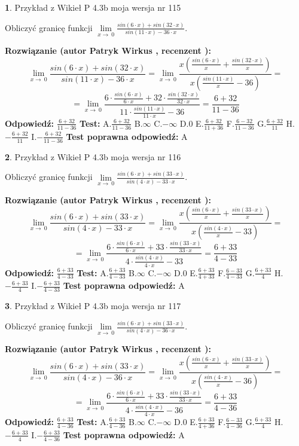 \documentclass[12pt, a4paper]{article}
\theoremstyle{definition} %
\newtheorem{zad}{}
\newcommand{\zadStart}[1]{\begin{zad}#1\newline}
\newcommand{\zadStop}{\end{zad}}
\newcommand{\rozwStart}[2]{\noindent \textbf{Rozwiązanie (autor #1 , recenzent #2): }\newline}
\newcommand{\rozwStop}{\newline}
\newcommand{\odpStart}{\noindent \textbf{Odpowiedź:}\newline}
\newcommand{\odpStop}{\newline}
\newcommand{\testStart}{\noindent \textbf{Test:}\newline}
\newcommand{\testStop}{\newline}
\newcommand{\kluczStart}{\noindent \textbf{Test poprawna odpowiedź:}\newline}
\newcommand{\kluczStop}{\newline}
\begin{document}
\zadStart{Przykład z Wikieł P 4.3b moja wersja nr 115}


Obliczyć granicę funkcji $\lim\limits_{x\to\ 0}\frac{sin(6 \cdot x)+sin(32 \cdot x)}{sin(11 \cdot x)-36 \cdot x}$.
\zadStop
\rozwStart{Patryk Wirkus}{}
$$\lim\limits_{x\to\ 0}\frac{sin(6 \cdot x)+sin(32 \cdot x)}{sin(11 \cdot x)-36 \cdot x}=\lim\limits_{x\to\ 0}\frac{x(\frac{sin(6 \cdot x)}{x}+\frac{sin(32 \cdot x)}{x})}{x(\frac{sin(11 \cdot x)}{x}-36)}=$$
$$=\lim\limits_{x\to\ 0}\frac{6 \cdot \frac{sin(6 \cdot x)}{6 \cdot x}+32 \cdot \frac{sin(32 \cdot x)}{32 \cdot x}}{11 \cdot \frac{sin(11 \cdot x)}{11 \cdot x}-36}=\frac{6+32}{11-36}$$
\rozwStop
\odpStart
$\frac{6+32}{11-36}$
\odpStop
\testStart
A.$\frac{6+32}{11-36}$
B.$\infty$
C.$-\infty$
D.$0$
E.$\frac{6+32}{11+36}$
F.$\frac{6-32}{11-36}$
G.$\frac{6+32}{11}$
H.$-\frac{6+32}{11}$
I.$-\frac{6+32}{11-36}$
\testStop
\kluczStart
A
\kluczStop



\zadStart{Przykład z Wikieł P 4.3b moja wersja nr 116}


Obliczyć granicę funkcji $\lim\limits_{x\to\ 0}\frac{sin(6 \cdot x)+sin(33 \cdot x)}{sin(4 \cdot x)-33 \cdot x}$.
\zadStop
\rozwStart{Patryk Wirkus}{}
$$\lim\limits_{x\to\ 0}\frac{sin(6 \cdot x)+sin(33 \cdot x)}{sin(4 \cdot x)-33 \cdot x}=\lim\limits_{x\to\ 0}\frac{x(\frac{sin(6 \cdot x)}{x}+\frac{sin(33 \cdot x)}{x})}{x(\frac{sin(4 \cdot x)}{x}-33)}=$$
$$=\lim\limits_{x\to\ 0}\frac{6 \cdot \frac{sin(6 \cdot x)}{6 \cdot x}+33 \cdot \frac{sin(33 \cdot x)}{33 \cdot x}}{4 \cdot \frac{sin(4 \cdot x)}{4 \cdot x}-33}=\frac{6+33}{4-33}$$
\rozwStop
\odpStart
$\frac{6+33}{4-33}$
\odpStop
\testStart
A.$\frac{6+33}{4-33}$
B.$\infty$
C.$-\infty$
D.$0$
E.$\frac{6+33}{4+33}$
F.$\frac{6-33}{4-33}$
G.$\frac{6+33}{4}$
H.$-\frac{6+33}{4}$
I.$-\frac{6+33}{4-33}$
\testStop
\kluczStart
A
\kluczStop



\zadStart{Przykład z Wikieł P 4.3b moja wersja nr 117}


Obliczyć granicę funkcji $\lim\limits_{x\to\ 0}\frac{sin(6 \cdot x)+sin(33 \cdot x)}{sin(4 \cdot x)-36 \cdot x}$.
\zadStop
\rozwStart{Patryk Wirkus}{}
$$\lim\limits_{x\to\ 0}\frac{sin(6 \cdot x)+sin(33 \cdot x)}{sin(4 \cdot x)-36 \cdot x}=\lim\limits_{x\to\ 0}\frac{x(\frac{sin(6 \cdot x)}{x}+\frac{sin(33 \cdot x)}{x})}{x(\frac{sin(4 \cdot x)}{x}-36)}=$$
$$=\lim\limits_{x\to\ 0}\frac{6 \cdot \frac{sin(6 \cdot x)}{6 \cdot x}+33 \cdot \frac{sin(33 \cdot x)}{33 \cdot x}}{4 \cdot \frac{sin(4 \cdot x)}{4 \cdot x}-36}=\frac{6+33}{4-36}$$
\rozwStop
\odpStart
$\frac{6+33}{4-36}$
\odpStop
\testStart
A.$\frac{6+33}{4-36}$
B.$\infty$
C.$-\infty$
D.$0$
E.$\frac{6+33}{4+36}$
F.$\frac{6-33}{4-36}$
G.$\frac{6+33}{4}$
H.$-\frac{6+33}{4}$
I.$-\frac{6+33}{4-36}$
\testStop
\kluczStart
A
\kluczStop
\end{document}
